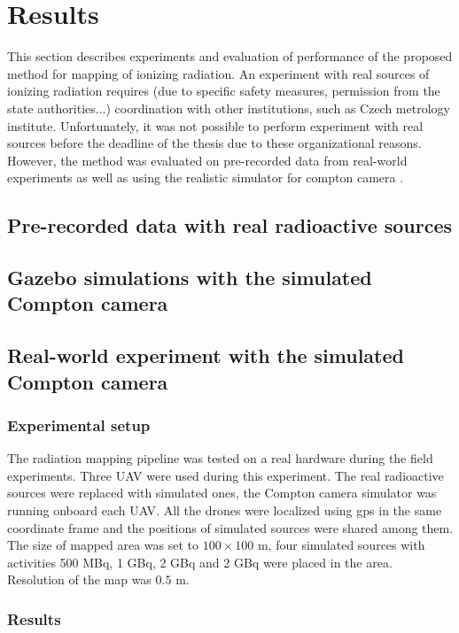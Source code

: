 
\chapter{Results\label{chap:results}}

This section describes experiments and evaluation of performance of the proposed method for mapping of ionizing radiation.
An experiment with real sources of ionizing radiation requires (due to specific safety measures, permission from the state authorities...) coordination with other institutions, such as Czech metrology institute.
Unfortunately, it was not possible to perform experiment with real sources before the deadline of the thesis due to these organizational reasons.
However, the method was evaluated on pre-recorded data from real-world experiments as well as using the realistic simulator for compton camera \cite{TODO}.

\section{Pre-recorded data with real radioactive sources}


\section{Gazebo simulations with the simulated Compton camera}

\section{Real-world experiment with the simulated Compton camera}
\subsection{Experimental setup}
The radiation mapping pipeline was tested on a real hardware during the field experiments.
Three \ac{UAV} were used during this experiment.
The real radioactive sources were replaced with simulated ones, the Compton camera simulator \cite{TODO} was running onboard each \ac{UAV}.
All the drones were localized using \ac{gps} in the same coordinate frame and the positions of simulated sources were shared among them.
The size of mapped area was set to $100 \times 100$ m, four simulated sources with activities 500 MBq, 1 GBq, 2 GBq and 2 GBq were placed in the area.
Resolution of the map was $0.5$ m.

\subsection{Results}

